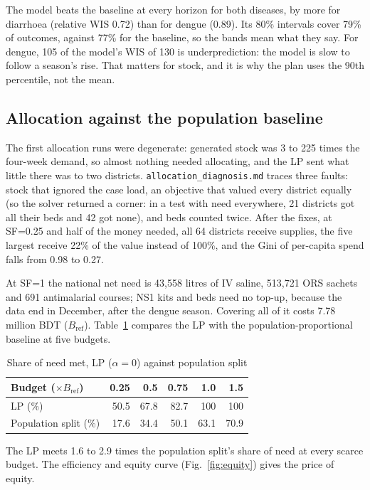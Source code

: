 The model beats the baseline at every horizon for both diseases, by more for diarrhoea (relative WIS 0.72)
than for dengue (0.89). Its 80\% intervals cover 79\% of outcomes, against 77\% for the baseline, so the bands
mean what they say. For dengue, 105 of the model's WIS of 130 is underprediction: the model is slow to follow a
season's rise. That matters for stock, and it is why the plan uses the 90th percentile, not the mean.

\subsection{Allocation against the population baseline}\label{sec:alloc}
The first allocation runs were degenerate: generated stock was 3 to 225 times the four-week demand, so almost
nothing needed allocating, and the LP sent what little there was to two districts.
\texttt{allocation\_diagnosis.md} traces three faults: stock that ignored the case load, an objective that
valued every district equally (so the solver returned a corner: in a test with need everywhere, 21 districts got
all their beds and 42 got none), and beds counted twice. After the fixes, at SF=0.25 and half of the money
needed, all 64 districts receive supplies, the five largest receive 22\% of the value instead of 100\%, and the
Gini of per-capita spend falls from 0.98 to 0.27.

At SF=1 the national net need is 43,558 litres of IV saline, 513,721 ORS sachets and 691 antimalarial courses;
NS1 kits and beds need no top-up, because the data end in December, after the dengue season. Covering all of it
costs 7.78 million BDT ($B_{\text{ref}}$). Table~\ref{tab:alloc} compares the LP with the population-proportional
baseline at five budgets.

\begin{table}[htbp]
\caption{Share of need met, LP ($\alpha=0$) against population split}
\label{tab:alloc}
\centering\small
\setlength{\tabcolsep}{4pt}
\begin{tabular}{@{}lrrrrr@{}}
\toprule
Budget ($\times B_{\text{ref}}$) & 0.25 & 0.5 & 0.75 & 1.0 & 1.5 \\
\midrule
LP (\%) & 50.5 & 67.8 & 82.7 & 100 & 100 \\
Population split (\%) & 17.6 & 34.4 & 50.1 & 63.1 & 70.9 \\
\bottomrule
\end{tabular}
\end{table}

The LP meets 1.6 to 2.9 times the population split's share of need at every scarce budget. The efficiency and equity curve
(Fig.~\ref{fig:equity}) gives the price of equity.

